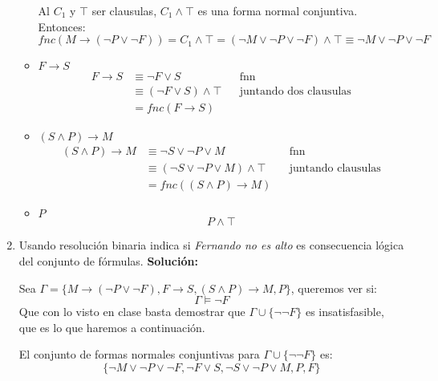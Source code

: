 \documentclass[8pt, letterpaper]{article}
\begin{document}
\begin{enumerate}
\begin{itemize}
    \hfill\break
    Al $C_1$ y $\top$ ser clausulas, $C_1 \land \top$ es una forma normal conjuntiva. Entonces:
    $$fnc(M\rightarrow (\neg P \lor \neg F)) = C_1 \land \top=
    (\neg M  \lor\neg P \lor \neg F) \land \top \equiv \neg M
    \lor\neg P \lor\neg F$$

  \item $ F\rightarrow S$
    \begin{align*}
      F\rightarrow S &\equiv \neg F \lor S  & &\text{fnn}\\
      &\equiv (\neg F \lor S)  \land \top& &\text{juntando dos clausulas}\\
      &= fnc(F\rightarrow S)
    \end{align*}
    
  \item$(S\land P) \rightarrow M$
    \begin{align*}
      (S\land P) \rightarrow M &\equiv \neg S \lor \neg P \lor M& &\text{fnn}\\
      &\equiv (\neg S \lor \neg P \lor M) \land \top & &
      \text{juntando clausulas}\\
      &= fnc((S\land P) \rightarrow M)
    \end{align*}
    
  \item $P$
    $$P\land\top$$
  \end{itemize}
  \rmfamily
  \newpage
\item Usando resolución binaria indica si {\it Fernando no es alto} es consecuencia lógica del conjunto de fórmulas.
  \hfill\break
  \ttfamily
 {\bf Solución:}

 Sea $\Gamma = \{M\rightarrow (\neg P \lor \neg F), F\rightarrow S,
 (S\land P) \rightarrow M,P\}$, queremos ver si:
 $$\Gamma\models \neg F$$
 Que con lo visto en clase basta demostrar que $\Gamma \cup \{\neg\neg F\}$ es
 insatisfasible, que es lo que haremos a continuación.

 \hfill\break
 El conjunto de formas normales conjuntivas para $\Gamma \cup \{\neg\neg F\}$ es:
 $$\{ \neg M  \lor\neg P \lor \neg F, \neg F \lor S, \neg S \lor \neg P \lor M,
 P, F \}$$


\end{enumerate}
\end{document}
